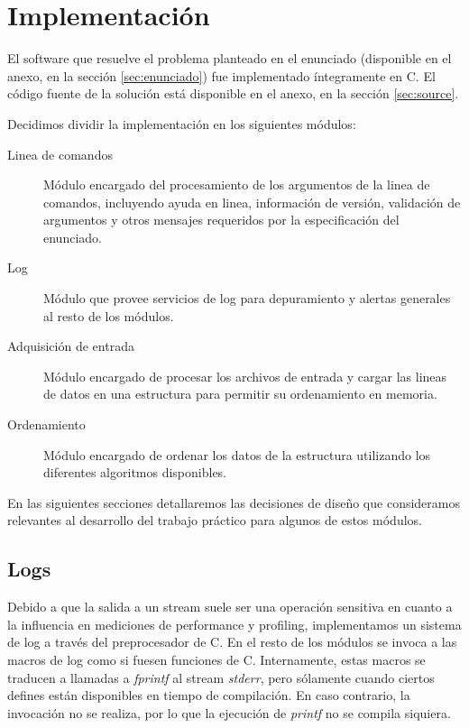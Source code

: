 \documentclass[a4paper,11pt]{article}
\begin{document}
\section{Implementación}

El software que resuelve el problema planteado en el enunciado (disponible en
el anexo, en la sección \ref{sec:enunciado}) fue implementado íntegramente en
C. El código fuente de la solución está disponible en el anexo, en la sección
\ref{sec:source}.

Decidimos dividir la implementación en los siguientes módulos:

\begin{description}
  \item[Linea de comandos] Módulo encargado del procesamiento de los argumentos
    de la linea de comandos, incluyendo ayuda en linea, información de versión,
    validación de argumentos y otros mensajes requeridos por la especificación
    del enunciado.
  \item[Log] Módulo que provee servicios de log para depuramiento y alertas
    generales al resto de los módulos.
  \item[Adquisición de entrada] Módulo encargado de procesar los archivos de
    entrada y cargar las lineas de datos en una estructura para permitir su
    ordenamiento en memoria.
  \item[Ordenamiento] Módulo encargado de ordenar los datos de la estructura
    utilizando los diferentes algoritmos disponibles.
\end{description}

En las siguientes secciones detallaremos las decisiones de diseño que
consideramos relevantes al desarrollo del trabajo práctico para algunos de
estos módulos.

\subsection{Logs}

Debido a que la salida a un stream suele ser una operación sensitiva en cuanto
a la influencia en mediciones de performance y profiling, implementamos un
sistema de log a través del preprocesador de C. En el resto de los módulos se
invoca a las macros de log como si fuesen funciones de C. Internamente, estas
macros se traducen a llamadas a \textit{fprintf} al stream \textit{stderr},
pero sólamente cuando ciertos defines están disponibles en tiempo de
compilación. En caso contrario, la invocación no se realiza, por lo que la
ejecución de \textit{printf} no se compila siquiera.
\end{document}
